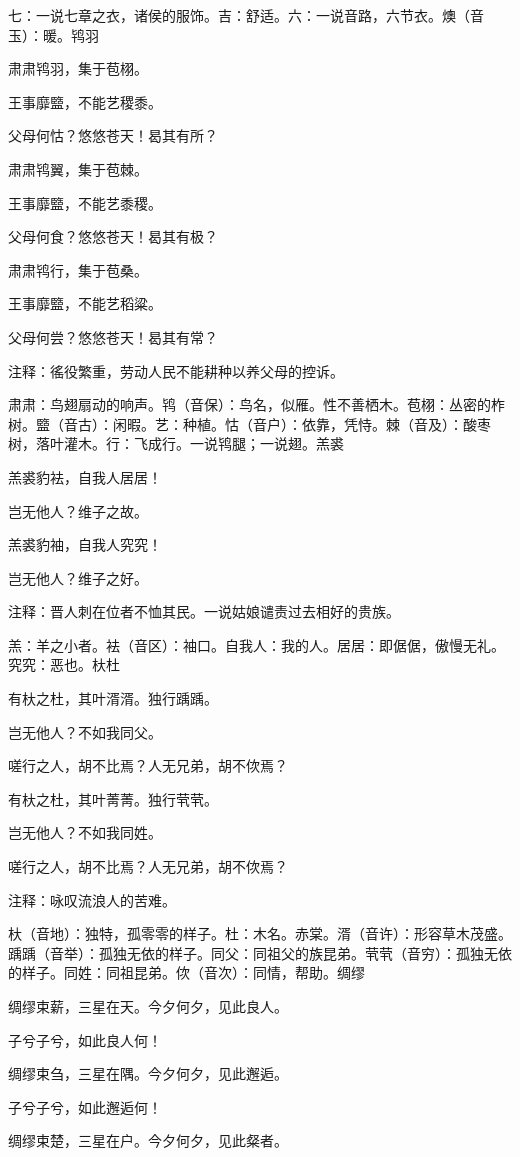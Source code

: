 \documentclass[12pt,UTF8]{ctexbook}
\begin{document}
七：一说七章之衣，诸侯的服饰。吉：舒适。六：一说音路，六节衣。燠（音玉）：暖。鸨羽

肃肃鸨羽，集于苞栩。

王事靡盬，不能艺稷黍。

父母何怙？悠悠苍天！曷其有所？

肃肃鸨翼，集于苞棘。

王事靡盬，不能艺黍稷。

父母何食？悠悠苍天！曷其有极？

肃肃鸨行，集于苞桑。

王事靡盬，不能艺稻粱。

父母何尝？悠悠苍天！曷其有常？

注释：徭役繁重，劳动人民不能耕种以养父母的控诉。

肃肃：鸟翅扇动的响声。鸨（音保）：鸟名，似雁。性不善栖木。苞栩：丛密的柞树。盬（音古）：闲暇。艺：种植。怙（音户）：依靠，凭恃。棘（音及）：酸枣树，落叶灌木。行：飞成行。一说鸨腿；一说翅。羔裘

羔裘豹袪，自我人居居！

岂无他人？维子之故。

羔裘豹袖，自我人究究！

岂无他人？维子之好。

注释：晋人刺在位者不恤其民。一说姑娘谴责过去相好的贵族。

羔：羊之小者。袪（音区）：袖口。自我人：我的人。居居：即倨倨，傲慢无礼。究究：恶也。杕杜

有杕之杜，其叶湑湑。独行踽踽。

岂无他人？不如我同父。

嗟行之人，胡不比焉？人无兄弟，胡不佽焉？

有杕之杜，其叶菁菁。独行茕茕。

岂无他人？不如我同姓。

嗟行之人，胡不比焉？人无兄弟，胡不佽焉？

注释：咏叹流浪人的苦难。

杕（音地）：独特，孤零零的样子。杜：木名。赤棠。湑（音许）：形容草木茂盛。踽踽（音举）：孤独无依的样子。同父：同祖父的族昆弟。茕茕（音穷）：孤独无依的样子。同姓：同祖昆弟。佽（音次）：同情，帮助。绸缪

绸缪束薪，三星在天。今夕何夕，见此良人。

子兮子兮，如此良人何！

绸缪束刍，三星在隅。今夕何夕，见此邂逅。

子兮子兮，如此邂逅何！

绸缪束楚，三星在户。今夕何夕，见此粲者。
\end{document}
